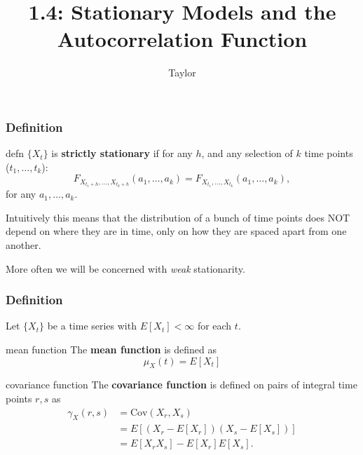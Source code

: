 \documentclass{beamer}
\title["1.4"]{1.4: Stationary Models and the Autocorrelation Function}
\author{Taylor}
\institute[UVA] 
{
University of Virginia \\
\medskip
\textit{} 
}
\date{}
\begin{document}

\begin{frame}
\titlepage 
\end{frame}

\begin{frame}
\frametitle{Definition}

\begin{block}{defn}
$\{X_t\}$ is {\bf strictly stationary} if for any $h$, and any selection of $k$ time points ($t_1, \ldots, t_k$):
\[
F_{X_{t_1 + h}, \ldots, X_{t_k +h}}(a_1, \ldots, a_k) = F_{X_{t_1}, \ldots, X_{t_k }}(a_1, \ldots, a_k),
\]
for any $a_1, \ldots, a_k$.
\end{block}

Intuitively this means that the distribution of a bunch of time points does NOT depend on where they are in time, only on how they are spaced apart from one another.
\newline

More often we will be concerned with \emph{weak} stationarity.

\end{frame}


\begin{frame}
\frametitle{Definition}

Let $\{X_t\}$ be a time series with $E[X_t] < \infty$ for each $t$.

\begin{block}{mean function}
The {\bf mean function} is defined as
\[
\mu_X(t) = E[X_t]
\]
\end{block}

\begin{block}{covariance function}
The {\bf covariance function} is defined on pairs of integral time points $r,s$ as 
\begin{align*}
\gamma_{X}(r,s) &= \text{Cov}(X_r, X_s) \\
&= E[(X_r - E[X_r])(X_s-E[X_s])] \\
&= E[X_rX_s] - E[X_r]E[X_s].
\end{align*}
\end{block}

\end{frame}

\end{document}
